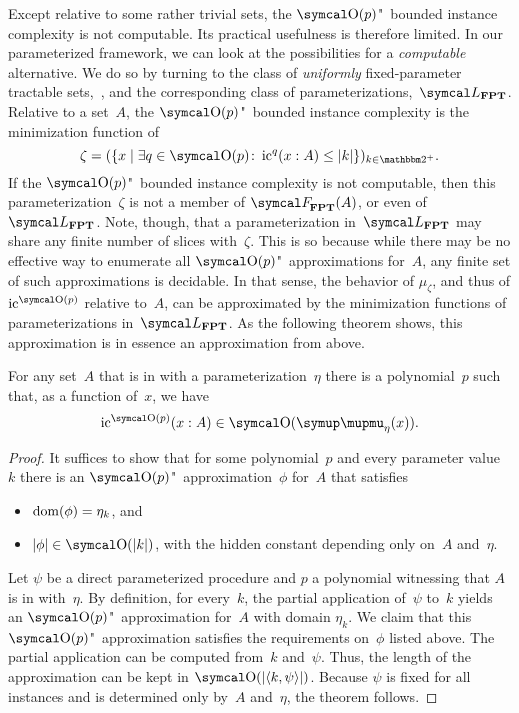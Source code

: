 Except relative to some rather trivial sets, the $\bigO(p)$"~bounded instance complexity is not computable.
Its practical usefulness is therefore limited.
In our parameterized framework, we can look at the possibilities for a \emph{computable} alternative.
We do so by turning to the class of \emph{uniformly} fixed-parameter tractable sets,~, and the corresponding class of parameterizations,~$\calL_\cl{FPT}$.
Relative to a set~$A$, the $\bigO(p)$"~bounded instance complexity is the minimization function of
\begin{equation}
\label{eq:icp}
  \zeta \deq (\{x \st \exists q \in \bigO(p)\colon \ic^q(x : A) \le \length{k}\})_{k \in \binary^+}.
\end{equation}
If the $\bigO(p)$"~bounded instance complexity is not computable, then this parameterization~$\zeta$ is not a member of $\calF_\cl{FPT}(A)$, or even of $\calL_\cl{FPT}$.
Note, though, that a parameterization in~$\calL_\cl{FPT}$ may share any finite number of slices with~$\zeta$.
This is so because while there may be no effective way to enumerate all $\bigO(p)$"~approximations for~$A$, any finite set of such approximations is decidable.
In that sense, the behavior of $\mu_\zeta$, and thus of $\ic^{\bigO(p)}$ relative to~$A$, can be approximated by the minimization functions of parameterizations in~$\calL_\cl{FPT}$.
As the following theorem shows, this approximation is in essence an approximation from above.
\begin{theorem}
\label{thm:fptic}%
  For any set~$A$ that is in  with a parameterization~$\eta$ there is a polynomial~$p$ such that, as a function of~$x$, we have
  \begin{equation*}
    \ic^{\bigO(p)}(x : A) \in \bigO(\mu_\eta(x)).
  \end{equation*}
\end{theorem}
\begin{proof}
  It suffices to show that for some polynomial~$p$ and every parameter value~$k$ there is an $\bigO(p)$"~approximation~$\phi$ for~$A$ that satisfies
  \begin{itemize}
  \item $\operatorname{dom}(\phi) = \eta_k$, and
  \item $\length{\phi} \in \bigO(\length{k})$, with the hidden constant depending only on~$A$ and~$\eta$.
  \end{itemize}
  Let $\psi$ be a direct parameterized procedure and $p$ a polynomial witnessing that $A$ is in  with~$\eta$.
  By definition, for every~$k$, the partial application of~$\psi$ to~$k$ yields an $\bigO(p)$"~approximation for~$A$ with domain $\eta_k$.
  We claim that this $\bigO(p)$"~approximation satisfies the requirements on~$\phi$ listed above.
  The partial application can be computed from~$k$ and~$\psi$.
  Thus, the length of the approximation can be kept in $\bigO(\length{\pair{k}{\psi}})$.
  Because $\psi$ is fixed for all instances and is determined only by~$A$ and~$\eta$, the theorem follows.
\end{proof}

